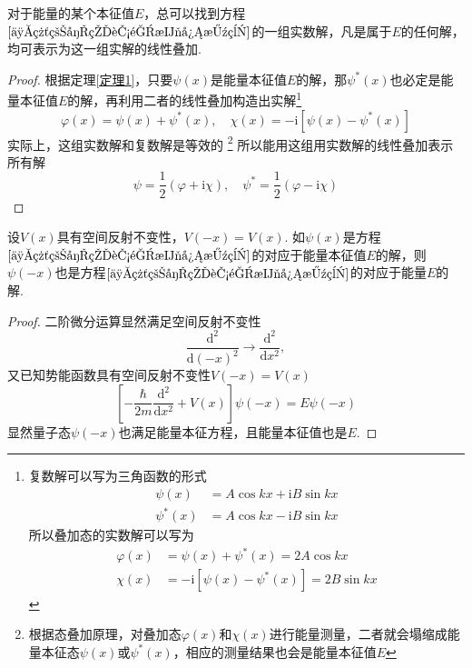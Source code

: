 \begin{theorem}\label{定理2}
    对于能量的某个本征值$E$，总可以找到方程$\eqref{一维粒子的能量本征方程}$的一组实数解，凡是属于$E$的任何解，均可表示为这一组实解的线性叠加.
\end{theorem}
\begin{proof}
    根据定理\ref{定理1}，只要$\psi(x)$是能量本征值$E$的解，那$\psi^*(x)$也必定是能量本征值$E$的解，再利用二者的线性叠加构造出实解\footnote{复数解可以写为三角函数的形式
        $$
            \begin{aligned}
                \psi(x)   & =A\cos{kx}+\mathrm{i}B\sin{kx} \\
                \psi^*(x) & =A\cos{kx}-\mathrm{i}B\sin{kx}
            \end{aligned}
        $$
        所以叠加态的实数解可以写为
        $$
            \begin{aligned}
                \varphi(x) & =\psi(x)+\psi^*(x)=2A\cos{kx}              \\
                \chi(x)    & =-\mathrm{i}[\psi(x)-\psi^*(x)]=2B\sin{kx}
            \end{aligned}
        $$
    }
    $$
        \varphi(x)=\psi(x)+\psi^*(x), \quad
        \chi(x) = -\mathrm{i}[\psi(x)-\psi^*(x)]
    $$
    实际上，这组实数解和复数解是等效的 \footnote{根据态叠加原理，对叠加态$\varphi(x)$和$\chi(x)$进行能量测量，二者就会塌缩成能量本征态$\psi(x)$或$\psi^*(x)$，相应的测量结果也会是能量本征值$E$} 所以能用这组用实数解的线性叠加表示所有解
    $$
        \psi=\frac{1}{2}(\varphi+\mathrm{i}\chi), \quad
        \psi^*=\frac{1}{2}(\varphi-\mathrm{i}\chi)
    $$
\end{proof}



\begin{theorem}\label{定理3}
    设$V(x)$具有空间反射不变性，$V(-x)=V(x)$. 如$\psi(x)$是方程$\eqref{一维粒子的能量本征方程}$的对应于能量本征值$E$的解，则$\psi(-x)$也是方程$\eqref{一维粒子的能量本征方程}$的对应于能量$E$的解.
\end{theorem}

\begin{proof}
    二阶微分运算显然满足空间反射不变性
    $$
        \frac{\mathrm{d}^2}{\mathrm{d}(-x)^2}\rightarrow\frac{\mathrm{d}^2}{\mathrm{d}x^2},
    $$
    又已知势能函数具有空间反射不变性$V(-x)=V(x)$
    $$
        \left[-\frac{\hbar}{2m}\frac{\mathrm{d}^2}{\mathrm{d}x^2}+V(x)\right]\psi(-x)=E\psi(-x)
    $$
    显然量子态$\psi(-x)$也满足能量本征方程，且能量本征值也是$E$.
\end{proof}




